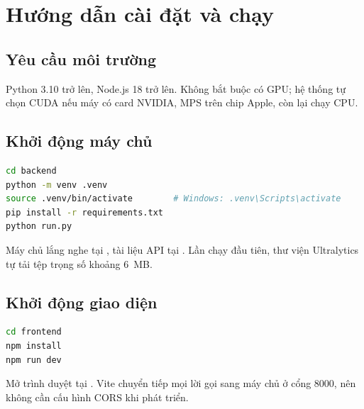 %
\chapter{Hướng dẫn cài đặt và chạy}
\label{app:caidat}

\section{Yêu cầu môi trường}

Python 3.10 trở lên, Node.js 18 trở lên. Không bắt buộc có GPU; hệ thống tự chọn
CUDA nếu máy có card NVIDIA, MPS trên chip Apple, còn lại chạy CPU.

\section{Khởi động máy chủ}

\begin{lstlisting}[language=bash, caption={Cài đặt và chạy backend}]
cd backend
python -m venv .venv
source .venv/bin/activate        # Windows: .venv\Scripts\activate
pip install -r requirements.txt
python run.py
\end{lstlisting}

Máy chủ lắng nghe tại , tài liệu API tại
. Lần chạy đầu tiên, thư viện Ultralytics tự tải
tệp trọng số  khoảng 6~MB.

\section{Khởi động giao diện}

\begin{lstlisting}[language=bash, caption={Cài đặt và chạy frontend}]
cd frontend
npm install
npm run dev
\end{lstlisting}

Mở trình duyệt tại . Vite chuyển tiếp mọi lời gọi
 sang máy chủ ở cổng 8000, nên không cần cấu hình CORS khi phát triển.

